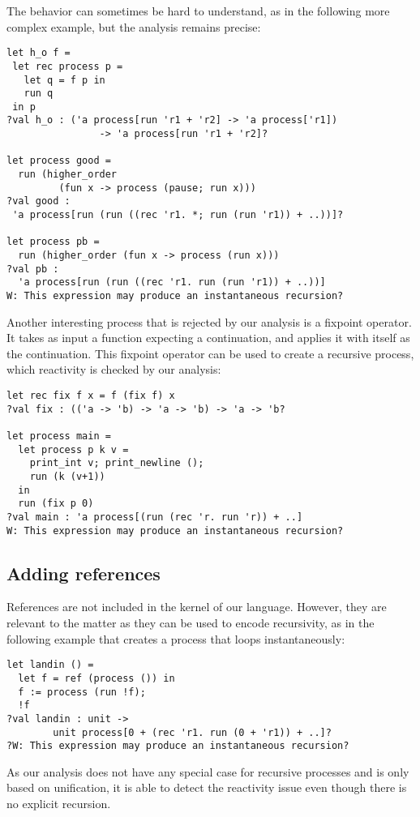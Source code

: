 \documentclass[9pt,preprint]{sigplanconf}
\begin{document}
The behavior can sometimes be hard to understand, as in the following more complex example, but the analysis remains precise:
\begin{lstlisting}
let h_o f =
 let rec process p =
   let q = f p in
   run q
 in p
?val h_o : ('a process[run 'r1 + 'r2] -> 'a process['r1]) 
                -> 'a process[run 'r1 + 'r2]?

let process good = 
  run (higher_order 
         (fun x -> process (pause; run x)))
?val good :
 'a process[run (run ((rec 'r1. *; run (run 'r1)) + ..))]?

let process pb = 
  run (higher_order (fun x -> process (run x)))
?val pb :
  'a process[run (run ((rec 'r1. run (run 'r1)) + ..))]
W: This expression may produce an instantaneous recursion?
\end{lstlisting}

Another interesting process that is rejected by our analysis is a fixpoint operator. It takes as input a function expecting a continuation, and applies it with itself as the continuation. This fixpoint operator can be used to create a recursive process, which reactivity is checked by our analysis:
\begin{lstlisting}
let rec fix f x = f (fix f) x
?val fix : (('a -> 'b) -> 'a -> 'b) -> 'a -> 'b?

let process main =
  let process p k v =
    print_int v; print_newline (); 
    run (k (v+1))
  in
  run (fix p 0)
?val main : 'a process[(run (rec 'r. run 'r)) + ..]
W: This expression may produce an instantaneous recursion?
\end{lstlisting}

\subsection{Adding references}

References are not included in the kernel of our language. However, they are relevant to the matter as they can be used to encode recursivity, as in the following example that creates a process that loops instantaneously:
%
\begin{lstlisting}
let landin () =
  let f = ref (process ()) in
  f := process (run !f);
  !f
?val landin : unit -> 
        unit process[0 + (rec 'r1. run (0 + 'r1)) + ..]?
?W: This expression may produce an instantaneous recursion?
\end{lstlisting}
%
As our analysis does not have any special case for recursive processes and is only based on unification, it is able to detect the reactivity issue even though there is no explicit recursion.
\end{document}
